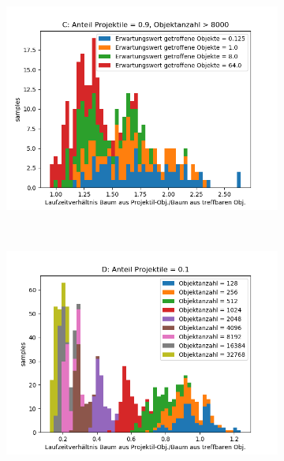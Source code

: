\begin{figure}
\begin{subfigure}[t]{0.55\textwidth}
		\label{fig:boxsortChoice-shotgun-B}
	\end{subfigure}
~
	\begin{subfigure}[t]{0.55\textwidth}
		\centering
		\includegraphics[width=1\textwidth]{./res/boxsortChoice-shotgun-C.png}

		\label{fig:boxsortChoice-shotgun-C}
	\end{subfigure}
~
	\begin{subfigure}[t]{0.55\textwidth}
		\centering
		\includegraphics[width=1\textwidth]{./res/boxsortChoice-shotgun-D.png}


\end{subfigure}
\end{figure}
